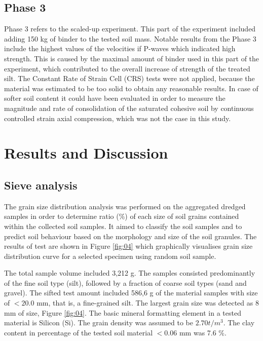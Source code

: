 \documentclass{amestyle}
\begin{document}
\subsection{Phase 3}

Phase 3 refers to the scaled-up experiment. This part of the experiment included adding 150 kg of binder to the tested soil mass. Notable results from the Phase 3 include the highest values of the velocities if P-waves which indicated high strength. This is caused by the maximal amount of binder used in this part of the experiment, which contributed to the overall increase of strength of the treated silt. The Constant Rate of Strain Cell (CRS) tests were not applied, because the material was estimated to be too solid to obtain any reasonable results. In case of softer soil content it could have been evaluated in order to measure the magnitude and rate of consolidation of the saturated cohesive soil by continuous controlled strain axial compression, which was not the case in this study. 

\section{Results and Discussion}
\subsection{Sieve analysis}

The grain size distribution analysis was performed on the aggregated dredged samples in order to determine ratio (\%) of each size of soil grains contained within the collected soil samples. It aimed to classify the soil samples and to predict soil behaviour based on the morphology and size of the soil granules. The results of test are shown in Figure \ref{fig:04} which graphically visualises grain size distribution curve for a selected specimen using random soil sample.   

The total sample volume included 3,212 g. The samples consisted predominantly of the fine soil type (silt), followed by a fraction of coarse soil types (sand and gravel). The sifted test amount included 586,6 g of the material samples with size of $<20.0$ mm, that is, a fine-grained silt. The largest grain size was detected as 8 mm of size, Figure \ref{fig:04}. The basic mineral formatting element in a tested material is Silicon (Si). The grain density was assumed to be $2.70t/m^3$. The clay content in percentage of the tested soil material $<0.06$ mm was 7.6 \%. 
\end{document}
